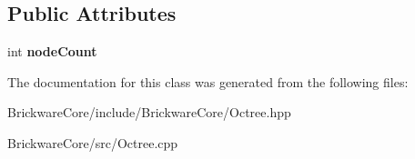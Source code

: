 \subsection*{Public Attributes}
\begin{DoxyCompactItemize}
\item 
\hypertarget{classBrickware_1_1Core_1_1Octree_a4f3fcdf552becdd00f9704b5e75ed3f3}{}int {\bfseries node\+Count}\label{classBrickware_1_1Core_1_1Octree_a4f3fcdf552becdd00f9704b5e75ed3f3}

\end{DoxyCompactItemize}


The documentation for this class was generated from the following files\+:\begin{DoxyCompactItemize}
\item 
Brickware\+Core/include/\+Brickware\+Core/Octree.\+hpp\item 
Brickware\+Core/src/Octree.\+cpp\end{DoxyCompactItemize}
